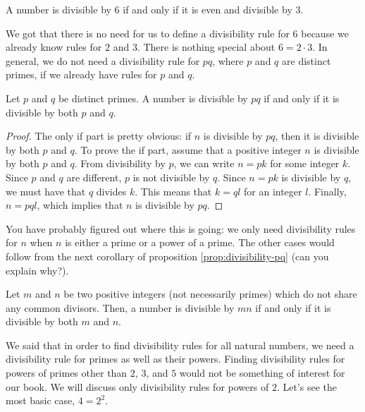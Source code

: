 \documentclass{subfile}
\begin{document}
\begin{proposition}[Divisibility by $6$]
	A number is divisible by $6$ if and only if it is even and divisible by $3$.
\end{proposition}

We got that there is no need for us to define a divisibility rule for $6$ because we already know rules for $2$ and $3$. There is nothing special about $6=2 \cdot 3$. In general, we do not need a divisibility rule for $pq$, where $p$ and $q$ are distinct primes, if we already have rules for $p$ and $q$.

\begin{proposition}[Divisibility by $pq$] \label{prop:divisibility-pq}
	Let $p$ and $q$ be distinct primes. A number is divisible by $pq$ if and only if it is divisible by both $p$ and $q$.
\end{proposition}

\begin{proof}
	The only if part is pretty obvious: if $n$ is divisible by $pq$, then it is divisible by both $p$ and $q$. To prove the if part, assume that a positive integer $n$ is divisible by both $p$ and $q$. From divisibility by $p$, we can write $n=pk$ for some integer $k$. Since $p$ and $q$ are different, $p$ is not divisible by $q$. Since $n=pk$ is divisible by $q$, we must have that $q$ divides $k$. This means that $k=ql$ for an integer $l$. Finally, $n=pql$, which implies that $n$ is divisible by $pq$.
\end{proof}


You have probably figured out where this is going: we only need divisibility rules for $n$ when $n$ is either a prime or a power of a prime. The other cases would follow from the next corollary of proposition \eqref{prop:divisibility-pq} (can you explain why?).

\begin{corollary}
	Let $m$ and $n$ be two positive integers (not necessarily primes) which do not share any common divisors. Then, a number is divisible by $mn$ if and only if it is divisible by both $m$ and $n$.
\end{corollary}

We said that in order to find divisibility rules for all natural numbers, we need a divisibility rule for primes as well as their powers. Finding divisibility rules for powers of primes other than $2$, $3$, and $5$ would not be something of interest for our book. We will discuss only divisibility rules for powers of $2$. Let's see the most basic case, $4=2^2$.
\end{document}

